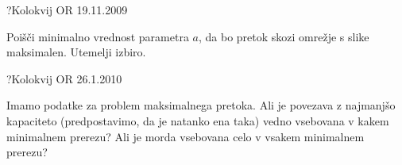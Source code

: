 
\begin{naloga}{?}{Kolokvij OR 19.11.2009}
\begin{vprasanje}[minmaxpretok]
Poišči minimalno vrednost parametra $a$,
da bo pretok skozi omrežje s slike~\fig{} maksimalen.
Utemelji izbiro.

\begin{slika}
\pgfslika
{}
\end{slika}
\end{vprasanje}
\begin{odgovor}
\end{odgovor}
\end{naloga}


\begin{naloga}{?}{Kolokvij OR 26.1.2010}
\begin{vprasanje}[minkapaciteta]
Imamo podatke za problem maksimalnega pretoka.
Ali je povezava z najmanjšo kapaciteto
(predpostavimo, da je natanko ena taka)
vedno vsebovana v kakem minimalnem prerezu?
Ali je morda vsebovana celo v vsakem minimalnem prerezu?
\end{vprasanje}
\begin{odgovor}
\end{odgovor}
\end{naloga}


